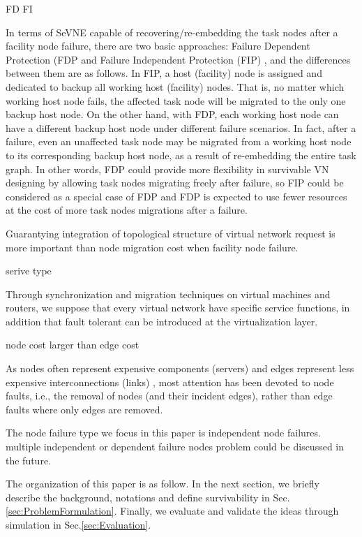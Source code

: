 FD  FI

In terms of SeVNE capable of recovering/re-embedding the task nodes after a facility node failure, there are two basic approaches: Failure Dependent Protection (FDP \cite{yu2010survivable} and Failure Independent Protection (FIP) \cite{yeow2011designing}, and the differences between them are as follows. In FIP, a host (facility) node is assigned and dedicated to backup all working host (facility) nodes. That is, no matter which working host node fails, the affected task node will be migrated to the only one backup host node. On the other hand, with FDP, each working host node can have a different backup host node under different failure scenarios. In fact, after a failure, even an unaffected task node may be migrated from a working host node to its corresponding backup host node, as a result of re-embedding the entire task graph. In other words, FDP could provide more flexibility in survivable VN designing by allowing task nodes migrating freely after failure, so FIP could be considered as a special case of FDP and FDP is expected to use fewer resources at the cost of more task nodes migrations after a failure.


Guarantying integration of topological structure of virtual network request is more important than node migration cost when facility node failure.


serive type

Through synchronization\cite{bressoud1996hypervisor,cully2008remus} and migration techniques\cite{clark2005live,wang2008virtual} on virtual machines and routers, we suppose that every virtual network have specific service functions, in addition that fault tolerant can be introduced at the virtualization layer\cite{yeow2011designing}. \cite{qu2016delay}

node cost larger than edge cost

As nodes often represent expensive components (servers) and edges represent less expensive interconnections (links) \cite{armbrust2009above,yu2010survivable}, most attention has been devoted to node faults, i.e., the removal of nodes (and their incident edges), rather than edge faults where only edges are removed.

The node failure type we focus in this paper is independent node failures. multiple independent or dependent failure nodes problem could be discussed in the future.


%

The organization of this paper is as follow. In the next section, we briefly describe the background, notations and define survivability in Sec.\ref{sec:ProblemFormulation}. Finally, we evaluate and validate the ideas through simulation in Sec.\ref{sec:Evaluation}.
